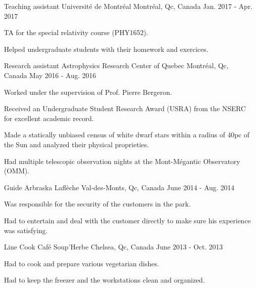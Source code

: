 \begin{cventries}
  \cventry
    {Teaching assistant}
    {Universit\'e de Montr\'eal}
    {Montr\'eal, Qc, Canada}
    {Jan. 2017 - Apr. 2017}
    {
      \begin{cvitems}
        \item {TA for the special relativity course (PHY1652).}
        \item {Helped undergraduate students with their homework and exercices.}
      \end{cvitems}
    }
  \cventry
    {Research assistant}
    {Astrophysics Research Center of Quebec}
    {Montr\'eal, Qc, Canada}
    {May 2016 - Aug. 2016}
    {
      \begin{cvitems}
        \item {Worked under the supervision of Prof. Pierre Bergeron.}
        \item {Received an Undergraduate Student Research Award (USRA) from the NSERC for excellent academic record.}
        \item {Made a statically unbiased census of white dwarf stars within a radius of 40pc of the Sun and analyzed their physical proprieties.}
        \item {Had multiple telescopic observation nights at the Mont-M\'egantic Observatory (OMM).}
      \end{cvitems}
    }
  \cventry
    {Guide}
    {Arbraska Lafl\`eche}
    {Val-des-Monts, Qc, Canada}
    {June 2014 - Aug. 2014}
    {
      \begin{cvitems}
        \item{Was responsible for the security of the customers in the park.}
        \item{Had to entertain and deal with the customer directly to make sure his experience was satisfying.}
     \end{cvitems}
    }
  \cventry
    {Line Cook}
    {Caf\'e Soup'Herbe}
    {Chelsea, Qc, Canada}
    {June 2013 - Oct. 2013}
    {
      \begin{cvitems}
        \item{Had to cook and prepare various vegetarian dishes.}
        \item{Had to keep the freezer and the workstations clean and organized.}
      \end{cvitems}
    }

\end{cventries}
